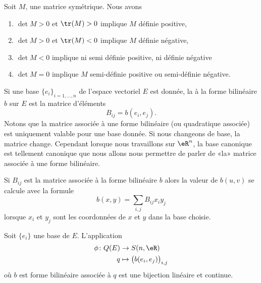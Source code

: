 \begin{proposition}     \label{PropcnJyXZ}
    Soit $M$, une matrice symétrique. Nous avons
    \begin{enumerate}
        \item
        $\det M>0$ et $\tr(M)>0$ implique $M$ définie positive,
        \item
        $\det M>0$ et $\tr(M)<0$ implique $M$ définie négative,
    \item   \label{ItemluuFPN}
        $\det M<0$ implique ni semi définie positive, ni définie négative 
        \item
        $\det M=0$ implique $M$ semi-définie positive ou semi-définie négative.
    \end{enumerate}
\end{proposition}

Si une base \( \{ e_i \}_{i=1,\ldots, n}\) de l'espace vectoriel \( E\) est donnée, la  à la forme bilinéaire \( b\) sur \( E\) est la matrice d'éléments
\begin{equation}
    B_{ij}=b(e_i,e_j).
\end{equation}
Notons que la matrice associée à une forme bilinéaire (ou quadratique associée) est uniquement valable pour une base donnée. Si nous changeons de base, la matrice change. Cependant lorsque nous travaillons sur \( \eR^n\), la base canonique est tellement canonique que nous allons nous permettre de parler de «la» matrice associée à une forme bilinéaire. 

Si \( B_{ij}\) est la matrice associée à la forme bilinéaire \( b\) alors la valeur de \( b(u,v)\) se calcule avec la formule
\begin{equation}
    b(x,y)=\sum_{i,j}B_{ij}x_iy_j
\end{equation}
lorsque \( x_i\) et \( y_j\) sont les coordonnées de \( x\) et \( y\) dans la base choisie.

\begin{proposition} \label{PropFSXooRUMzdb}
    Soit \( \{ e_i \}\) une base de \( E\). L'application
    \begin{equation}
        \begin{aligned}
            \phi\colon Q(E)&\to S(n,\eR) \\
            q&\mapsto \big(   b(e_i,e_j)   \big)_{i,j}
        \end{aligned}
    \end{equation}
    où \( b\) est forme bilinéaire associée à \( q\) est une bijection linéaire et continue.
\end{proposition}

